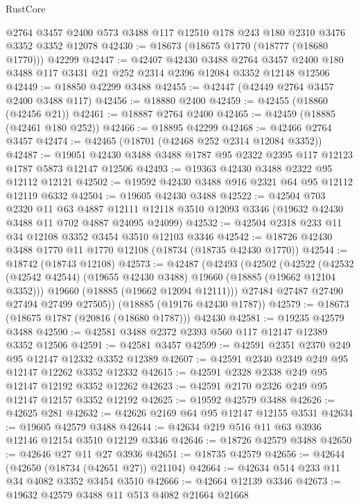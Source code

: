 \begin{lexlean}{RustCore}
\begin{coremodule}
    @2764
    @3457
    @2400
    @573
    @3488
    @117
    @12510
    @178
    @243
    @180
    @2310
    @3476
    @3352
    @3352
    @12078
@42430 := @18673 (@18675 @1770 (@18777 (@18680 @1770))) @42299
@42447 := @42407
    @42430
    @3488
    @2764
    @3457
    @2400
    @180
    @3488
    @117
    @3431
    @21
    @252
    @2314
    @2396
    @12084
    @3352
    @12148
    @12506
@42449 := @18850 @42299 @3488
@42455 := @42447 (@42449 @2764 @3457 @2400 @3488 @117)
@42456 := @18880 @2400
@42459 := @42455 (@18860 (@42456 @21))
@42461 := @18887 @2764 @2400
@42465 := @42459 (@18885 (@42461 @180 @252))
@42466 := @18895 @42299
@42468 := @42466 @2764 @3457
@42474 := @42465 (@18701 (@42468 @252 @2314 @12084 @3352))
@42487 := @19051 @42430 @3488 @3488 @1787 @95 @2322 @2395 @117 @12123 @1787 @5873 @12147 @12506
@42493 := @19363 @42430 @3488 @2322 @95 @12112 @12121
@42502 := @19592 @42430 @3488 @916 @2321 @64 @95 @12112 @12119 @6332
@42504 := @19605 @42430 @3488
@42522 := @42504
    @703
    @2320
    @11
    @63
    @4887
    @12111
    @12118
    @3510
    @12093
    @3346
    (@19632 @42430 @3488 @11 @702 @4887 @24095 @24099)
@42532 := @42504 @2318 @233 @11 @34 @12108 @3352 @3454 @3510 @12103 @3346
@42542 := @18726 @42430 @3488 @1770 @11 @1770 @12108 (@18734 (@18735 @42430 @1770))
@42544 := @18742 (@18743 @12108)
@42573 := @42487
    (@42493
      (@42502
        (@42522
          (@42532 (@42542 @42544) (@19655 @42430 @3488) @19660 (@18885 (@19662 @12104 @3352)))
          @19660
          (@18885 (@19662 @12094 @12111)))
        @27484
        @27487
        @27490
        @27494
        @27499
        @27505))
    (@18885 (@19176 @42430 @1787))
@42579 := @18673 (@18675 @1787 (@20816 (@18680 @1787))) @42430
@42581 := @19235 @42579 @3488
@42590 := @42581 @3488 @2372 @2393 @560 @117 @12147 @12389 @3352 @12506
@42591 := @42581 @3457
@42599 := @42591 @2351 @2370 @249 @95 @12147 @12332 @3352 @12389
@42607 := @42591 @2340 @2349 @249 @95 @12147 @12262 @3352 @12332
@42615 := @42591 @2328 @2338 @249 @95 @12147 @12192 @3352 @12262
@42623 := @42591 @2170 @2326 @249 @95 @12147 @12157 @3352 @12192
@42625 := @19592 @42579 @3488
@42626 := @42625 @281
@42632 := @42626 @2169 @64 @95 @12147 @12155 @3531
@42634 := @19605 @42579 @3488
@42644 := @42634 @219 @516 @11 @63 @3936 @12146 @12154 @3510 @12129 @3346
@42646 := @18726 @42579 @3488
@42650 := @42646 @27 @11 @27 @3936
@42651 := @18735 @42579
@42656 := @42644 (@42650 (@18734 (@42651 @27)) @21104)
@42664 := @42634 @514 @233 @11 @34 @4082 @3352 @3454 @3510
@42666 := @42664 @12139 @3346
@42673 := @19632 @42579 @3488 @11 @513 @4082 @21664 @21668

\end{coremodule}
\end{lexlean}
